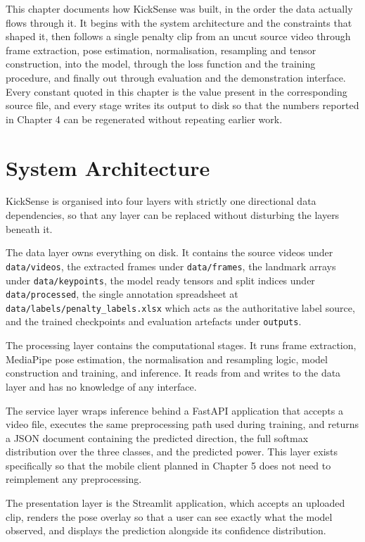 This chapter documents how KickSense was built, in the order the data actually flows through it. It begins with the system architecture and the constraints that shaped it, then follows a single penalty clip from an uncut source video through frame extraction, pose estimation, normalisation, resampling and tensor construction, into the model, through the loss function and the training procedure, and finally out through evaluation and the demonstration interface. Every constant quoted in this chapter is the value present in the corresponding source file, and every stage writes its output to disk so that the numbers reported in Chapter 4 can be regenerated without repeating earlier work.

\section{System Architecture}

KickSense is organised into four layers with strictly one directional data dependencies, so that any layer can be replaced without disturbing the layers beneath it.

The data layer owns everything on disk. It contains the source videos under \texttt{data/videos}, the extracted frames under \texttt{data/frames}, the landmark arrays under \texttt{data/keypoints}, the model ready tensors and split indices under \texttt{data/processed}, the single annotation spreadsheet at \texttt{data/labels/penalty\_labels.xlsx} which acts as the authoritative label source, and the trained checkpoints and evaluation artefacts under \texttt{outputs}.

The processing layer contains the computational stages. It runs frame extraction, MediaPipe pose estimation, the normalisation and resampling logic, model construction and training, and inference. It reads from and writes to the data layer and has no knowledge of any interface.

The service layer wraps inference behind a FastAPI application that accepts a video file, executes the same preprocessing path used during training, and returns a JSON document containing the predicted direction, the full softmax distribution over the three classes, and the predicted power. This layer exists specifically so that the mobile client planned in Chapter 5 does not need to reimplement any preprocessing.

The presentation layer is the Streamlit application, which accepts an uploaded clip, renders the pose overlay so that a user can see exactly what the model observed, and displays the prediction alongside its confidence distribution.

